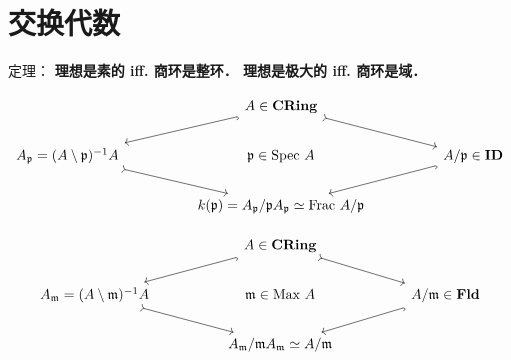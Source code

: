 \chapter{交换代数}

定理：
\textbf{理想是素的 iff. 商环是整环．
理想是极大的 iff. 商环是域．}

$$
\begin{tikzcd}
                                                                 &  & A\in\textbf{CRing} \arrow[lld, hook] \arrow[rrd, tail]                                      &  &                                                 \\
A_\mathfrak p = (A\setminus \mathfrak p)^{-1}A \arrow[rrd, tail] &  & \mathfrak p \in \text{Spec} \ A                                                             &  & A/\mathfrak p \in \textbf{ID} \arrow[lld, hook] \\
                                                                 &  & k(\mathfrak p) = A_\mathfrak p/\mathfrak p A_\mathfrak p \simeq \text{Frac} \ A/\mathfrak p &  &                                                
\end{tikzcd}
$$


$$
\begin{tikzcd}
                                                                 &  & A\in\textbf{CRing} \arrow[lld, hook] \arrow[rrd, tail]       &  &                                                  \\
A_\mathfrak m = (A\setminus \mathfrak m)^{-1}A \arrow[rrd, tail] &  & \mathfrak m \in \text{Max} \ A                               &  & A/\mathfrak m \in \textbf{Fld} \arrow[lld, hook] \\
                                                                 &  & A_\mathfrak m/\mathfrak m A_\mathfrak m \simeq A/\mathfrak m &  &                                                 
\end{tikzcd}
$$


